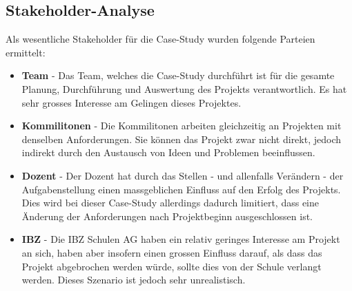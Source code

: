 \subsection{Stakeholder-Analyse}
Als wesentliche Stakeholder für die Case-Study wurden folgende Parteien ermittelt:

\begin{itemize}
  \item \textbf{Team} - Das Team, welches die Case-Study durchführt ist für die gesamte Planung, Durchführung und Auswertung des Projekts verantwortlich. Es hat sehr grosses Interesse am Gelingen dieses Projektes.
  \item \textbf{Kommilitonen} - Die Kommilitonen arbeiten gleichzeitig an Projekten mit denselben Anforderungen. Sie können das Projekt zwar nicht direkt, jedoch indirekt durch den Austausch von Ideen und Problemen beeinflussen.
  \item \textbf{Dozent} - Der Dozent hat durch das Stellen - und allenfalls Verändern - der Aufgabenstellung einen massgeblichen Einfluss auf den Erfolg des Projekts. Dies wird bei dieser Case-Study allerdings dadurch limitiert, dass eine Änderung der Anforderungen nach Projektbeginn ausgeschlossen ist.
  \item \textbf{IBZ} - Die IBZ Schulen AG haben ein relativ geringes Interesse am Projekt an sich, haben aber insofern einen grossen Einfluss darauf, als dass das Projekt abgebrochen werden würde, sollte dies von der Schule verlangt werden. Dieses Szenario ist jedoch sehr unrealistisch.
\end{itemize}

\vspace{5mm}

